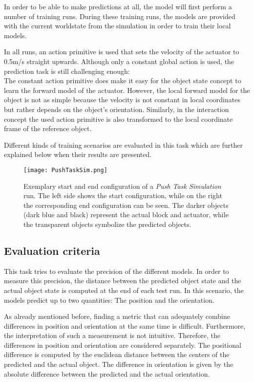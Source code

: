 In order to be able to make predictions at all, the model will first perform a number of training runs. During these training runs, the models are provided with the current worldstate from the simulation in order to train their local models.

In all runs, an action primitive is used that sets the velocity of the actuator to 0.5m/s straight upwards. Although only a constant global action is used, the prediction task is still challenging enough: \\
The constant action primitive does make it easy for the object state concept to learn the forward model of the actuator. However, the local forward model for the object is not as simple because the velocity is not constant in local coordinates but rather depends on the object's orientation. 
Similarly, in the interaction concept the used action primitive is also transformed to the local coordinate frame of the reference object.

Different kinds of training scenarios are evaluated in this task which are further explained below when their results are presented.


\begin{figure}
	\centering
	\texttt{[image: PushTaskSim.png]}
	\caption{Exemplary start and end configuration of a \textit{Push Task Simulation} run. The left side shows the start configuration, while on the right the corresponding end configuration can be seen.
		The darker objects (dark blue and black) represent the actual block and actuator, while the transparent objects symbolize the predicted objects.}
	\label{fig:pushTaskSim}
\end{figure}


\subsection{Evaluation criteria}

This task tries to evaluate the precision of the different models. In order to measure this precision, the distance between the predicted object state and the actual object state is computed at the end of each test run.
In this scenario, the models predict up to two quantities: The position and the orientation. 

As already mentioned before, finding a metric that can adequately combine differences in position and orientation at the same time is difficult. Furthermore, the interpretation of such a measurement is not intuitive. Therefore, the differences in position and orientation are considered separately. 
The positional difference is computed by the euclidean distance between the centers of the predicted and the actual object. The difference in orientation is given by the absolute difference between the predicted and the actual orientation.

